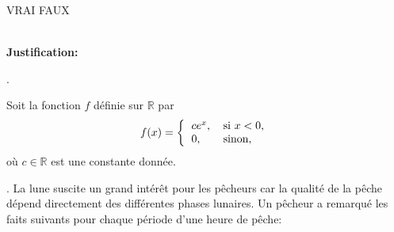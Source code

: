\begin{questions}
\begin{parts}
     \begin{oneparcheckboxes}
		\choice VRAI
		\correctchoice FAUX
\end{oneparcheckboxes}\\
{\bf Justification:}
\end{parts}


\newpage . \newpage

\question 
Soit la fonction $f$ définie sur $\mathbb{R}$ par 
\begin{align*}
f(x)= \left\{
\begin{tabular}{l l}
$c e^{x}$,&\mbox{si $x<0$},\\
$0$,& \mbox{sinon},
\end{tabular}
\right.
\end{align*}
où $c\in\mathbb{R}$ est une constante donnée. 

\vspace{0.2cm}

\newpage . \newpage
\question
La lune suscite un grand intérêt pour les pêcheurs car la qualité de la pêche dépend directement des différentes phases lunaires. Un pêcheur a remarqué les faits suivants pour chaque période d'une heure de pêche:


\end{questions}
